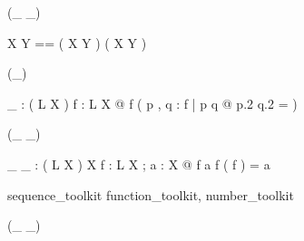 \begin{zed}
 \rightassoc (\_ \finj \_)
\end{zed}

\begin{zed}
X \finj Y == ( X \ffun Y ) \cap ( X \pinj Y )
\end{zed}

\begin{zed}
\relation (\disjoint \_)
\end{zed}

\begin{gendef}[L,X]
\disjoint \_ : \power ( L \rel \power X )
\where
\forall f : L \rel \power X @
\disjoint f \iff ( \forall p , q : f | p \neq q @ p.2 \cap q.2 = \emptyset )
\end{gendef}

\begin{zed}
\relation (\_ \partition \_)
\end{zed}

\begin{gendef}[L,X]
\_ \partition \_ : ( L \rel \power X ) \rel \power X
\where
\forall f : L \rel \power X ; a : \power X @
f \partition a \iff \disjoint f \land \bigcup ( \ran f ) = a
\end{gendef}

\begin{zsection}
\SECTION sequence\_toolkit \parents function\_toolkit, number\_toolkit
\end{zsection}
\begin{zed}
 \leftassoc (\_ \upto \_)
\end{zed}


